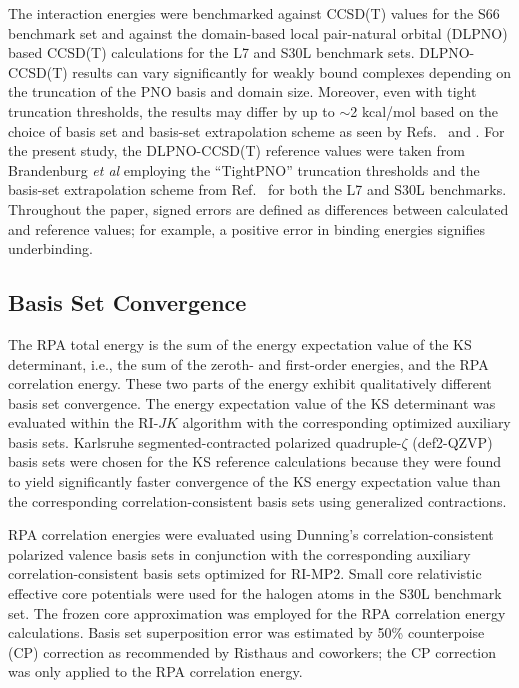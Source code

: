 \documentclass[journal=jctcce,manuscript=article]{achemso}
\begin{document}
The interaction energies were benchmarked against CCSD(T) values for
the S66 benchmark set\cite{doi:10.1021/ct2002946,doi:10.1021/ct200523a}
and against the domain-based local pair-natural orbital (DLPNO)
based CCSD(T) calculations for the L7 and S30L benchmark
sets.\cite{doi:10.1063/1.5090222,doi:10.1063/1.5012601}
DLPNO-CCSD(T) results can vary significantly for weakly bound
complexes depending on the truncation of the PNO basis and domain
size.\cite{doi:10.1021/ct501129s,doi:10.1021/acs.jpclett.9b01156}
Moreover, even with tight truncation thresholds, the results may
differ by up to $\sim$2 kcal/mol based on the choice of basis set and
basis-set extrapolation scheme as seen by Refs.~
and . For the present study,
the DLPNO-CCSD(T) reference values were taken from Brandenburg
\textit{et al}\cite{doi:10.1063/1.5012601} employing the ``TightPNO''
truncation thresholds\cite{doi:10.1021/ct501129s} and the basis-set extrapolation scheme from
Ref.~
for both the L7 and S30L benchmarks. Throughout the paper,
signed errors are defined as differences between calculated and
reference values; for example, a positive error in binding
energies signifies underbinding.

\subsection{Basis Set Convergence} \label{sub:basis_set}

The RPA total energy is the sum of the energy expectation value of the
KS determinant, i.e., the sum of the zeroth- and first-order energies, and
the RPA correlation energy. These two parts of the energy exhibit
qualitatively different basis set convergence\cite{Eshuis12JChemPhys136p084105}.
The energy expectation value of the KS determinant was evaluated within
the RI-$JK$ algorithm with the corresponding optimized auxiliary basis
sets.\cite{b204199p} Karlsruhe segmented-contracted polarized
quadruple-$\zeta$ (def2-QZVP) 
basis sets\cite{Weigend05PhysChemChemPhys7p3297,Weigend03JChemPhys119p12753}
were chosen for the KS reference calculations because they were
found to yield 
significantly faster convergence of the KS energy expectation value than
the corresponding correlation-consistent basis sets using generalized
contractions.\cite{Dunning89JChemPhys90p1007,doi:10.1063/1.464303,b415208e} 

RPA correlation energies were evaluated using Dunning's correlation-consistent 
polarized valence basis
sets\cite{Dunning89JChemPhys90p1007,doi:10.1063/1.464303} 
in conjunction with the corresponding auxiliary correlation-consistent basis
sets optimized for RI-MP2.\cite{Weigend02JChemPhys116p3175,b415208e}
Small core relativistic
effective core potentials\cite{doi:10.1063/1.1622924,doi:10.1021/jp065887l}
were used for the halogen atoms in the S30L\cite{Sure15JChemTheoryComput}
benchmark set.
The frozen core approximation was employed for the RPA correlation energy
calculations. Basis set superposition error was estimated by 50\%
counterpoise (CP) correction as recommended by Risthaus and
coworkers;\cite{Risthaus13JChemTheoryComput9p1580} the CP correction was
only applied to the RPA correlation energy.
\end{document}
